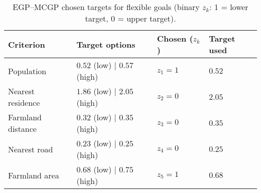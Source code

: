 \begin{table}[htbp]
\centering
\caption{EGP--MCGP chosen targets for flexible goals (binary $z_k$: 1 = lower target, 0 = upper target).}
\label{tab:egpMCGPTargets}
\begin{tabular}{llll}
\toprule
Criterion & Target options & Chosen ($z_k$) & Target used \\
\midrule
Population                 & $0.52$ (low) \;|\; $0.57$ (high) & $z_1=1$ & $0.52$ \\
Nearest residence          & $1.86$ (low) \;|\; $2.05$ (high) & $z_2=0$ & $2.05$ \\
Farmland distance          & $0.32$ (low) \;|\; $0.35$ (high) & $z_3=0$ & $0.35$ \\
Nearest road               & $0.23$ (low) \;|\; $0.25$ (high) & $z_4=0$ & $0.25$ \\
Farmland area              & $0.68$ (low) \;|\; $0.75$ (high) & $z_5=1$ & $0.68$ \\
\bottomrule
\end{tabular}
\end{table}